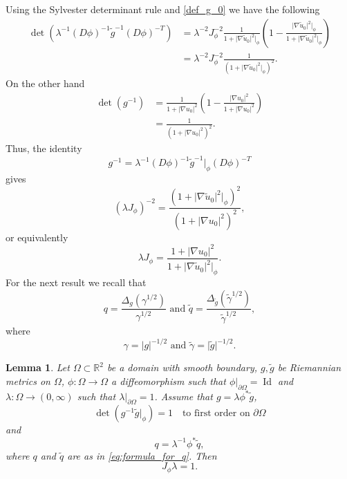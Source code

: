 \documentclass[a4paper, 10pt, twoside, notitlepage]{amsart}
\theoremstyle{plain}
\newtheorem{lem}[prop]{Lemma}
\newcommand{\Om}{\Omega}
\numberwithin{equation}{section}
\newcommand {\R} {\mathbb{R}} \newcommand {\Z} {\mathbb{Z}}
\newcommand {\p} {\partial}
\newcommand{\tbl}{\textcolor{blue}}
\newcommand{\abs}[1]{\lvert #1 \rvert}
\DeclareMathOperator{\Id} {Id}
\begin{document}
Using the Sylvester determinant rule and \eqref{def_g_0} we have the following
\begin{align*}
	\det(\lambda^{-1}(D\phi)^{-1}\tilde g^{-1}(D\phi)^{-T}) &= \lambda^{-2}J_{\phi}^{-2} \frac{1}{1+\abs{\nabla\tilde u_0}^2|_{\phi}}\left(1-\frac{\abs{\nabla\tilde u_0}^2|_{\phi}}{1+\abs{\nabla\tilde u_0}^2|_{\phi}}\right)\\
	&= \lambda^{-2}J_{\phi}^{-2}\frac{1}{(1+\abs{\nabla\tilde u_0}^2|_{\phi})^2}.
    \end{align*}
On the other hand
    \begin{align*}
	 \det(g^{-1})&=\frac{1}{1+\abs{\nabla u_0}^2}\left(1-\frac{\abs{\nabla u_0}^2}{1+\abs{\nabla u_0}^2}\right)\\
	&=\frac{1}{(1+\abs{\nabla u_0}^2)^2}.
\end{align*}
Thus, the identity
\[
g^{-1}=\lambda^{-1}(D\phi)^{-1}\tilde g^{-1}|_{\phi}(D\phi)^{-T}
\]
gives
\begin{equation*}
	(\lambda J_{\phi})^{-2}=\frac{(1+\abs{\nabla\tilde u_0}^2|_{\phi})^2}{(1+\abs{\nabla u_0}^2)^2},
\end{equation*}
or equivalently
\begin{equation}\label{lambda_times_J}
	\lambda J_{\phi} = \frac{1+\abs{\nabla u_0}^2}{1+\abs{\nabla\tilde u_0}^2|_{\phi}}.
\end{equation}
For the next result we recall that
\begin{equation}\label{eq:formula_for_q}
q=\dfrac{\Delta_g(\gamma^{1/2})}{\gamma^{1/2}} \text{ and } \tilde q=\dfrac{\Delta_{\tilde g}(\tilde \gamma^{1/2})}{\tilde \gamma^{1/2}},
\end{equation}
where
\[
\gamma=\abs{g}^{-1/2} \text{ and }\tilde \gamma=\abs{\tilde g}^{-1/2}.
\]

\begin{lem}\label{J_lambda}
	Let $\Om\subset\R^2$ be a domain with smooth boundary, $g, \tilde g$ be Riemannian metrics on $\Om$, $\phi\colon \Om\to\Om$ a diffeomorphism such that $\phi|_{\p\Om}=\Id$ and $\lambda\colon\Om\to (0,\infty)$ such that $\lambda|_{\p\Om}=1$. Assume that $g=\lambda\phi^*\tilde g$,
	\begin{equation}\label{boundary_eq}
		\det(g^{-1}\tilde g|_\phi)=1\quad\text{to first order on } \p \Omega 
	\end{equation}
	and 
	\begin{equation}\label{q_identity}
		q=\lambda^{-1}\phi^*\tilde q,
	\end{equation}
    where $q$ and $\tilde q$ are as in \eqref{eq:formula_for_q}. 
	Then
	\begin{equation}\label{J_lambda_identity}
		J_{\phi}\lambda=1.
	\end{equation}
\end{lem}
\end{document}
